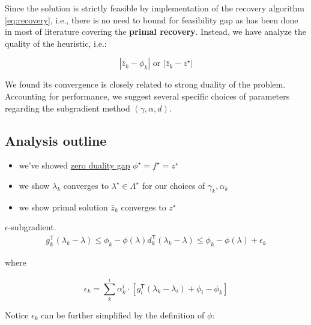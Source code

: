 Since the solution is strictly feasible by implementation of the
recovery algorithm \ref{eq:recovery}, i.e., there is no need to bound for feasibility gap
as has been done in most of literature covering the \textbf{primal
  recovery}. Instead, we have analyze the quality of the heuristic, i.e.:

\[
  |\bar z_k - \phi_k| \textrm { or } |\bar z_k - z^\star|
\]

We found its convergence is closely related to strong duality of the problem. Accounting for performance,
we suggest several specific choices of parameters regarding the subgradient method \((\gamma, \alpha, d)\).


\hypertarget{analysis-outline}{%
  \subsection{Analysis outline}\label{analysis-outline}}

\begin{itemize}
  \tightlist
  \item
        we've showed \hyperlink{conditions for strong-duality}{zero duality gap}
        \(\phi^\star = f^\star= z^\star\)
  \item
        we show \(\lambda_k\) converges to \(\lambda^\star \in \Lambda^\star\)
        for our choices of \(\gamma_k, \alpha_k\)
  \item
        we show primal solution \(\bar z_k\) converges to \(z^\star\)
\end{itemize}

\begin{lemma}\(\epsilon\)-subgradient.
  \begin{equation}\label{eq:subgrad}
    \begin{aligned}
      g_{k}^\mathsf{T}(\lambda_{k}  -\lambda) \le \phi_{k} - \phi(\lambda)
      d_{k}^\mathsf{T}(\lambda_{k}  -\lambda) \le \phi_{k} - \phi(\lambda) + \epsilon_k
    \end{aligned}
  \end{equation}
\end{lemma}

where

\begin{equation}\label{eq:def_eps}
  \epsilon_k = \sum^i_k \alpha^i_k \cdot \left [g_i^\mathsf{T}(\lambda_k - \lambda_i) + \phi_i - \phi_k \right ]
\end{equation}

Notice \(\epsilon_k\) can be further simplified by the definition of
\(\phi\):

